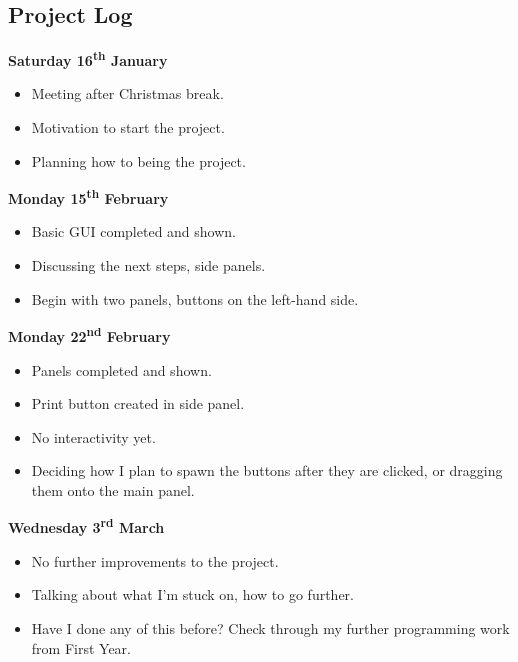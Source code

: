 \documentclass[a4paper, 12pt]{article}
\begin{document}
        \subsection{Project Log}
            \textbf{Saturday 16\textsuperscript{th} January}
                \begin{itemize}
                    \item Meeting after Christmas break.
                    \item Motivation to start the project.
                    \item Planning how to being the project. \\
                \end{itemize}
            \textbf{Monday 15\textsuperscript{th} February}
                \begin{itemize}
                    \item Basic GUI completed and shown.
                    \item Discussing the next steps, side panels.
                    \item Begin with two panels, buttons on the left-hand side. \\
                \end{itemize}
            \textbf{Monday 22\textsuperscript{nd} February}
                \begin{itemize}
                    \item Panels completed and shown.
                    \item Print button created in side panel.
                    \item No interactivity yet.
                    \item Deciding how I plan to spawn the buttons after they are clicked,
                    or dragging them onto the main panel. \\
                \end{itemize}
            \textbf{Wednesday 3\textsuperscript{rd} March}
                \begin{itemize}
                    \item No further improvements to the project.
                    \item Talking about what I'm stuck on, how to go further.
                    \item Have I done any of this before? Check through my further programming
                    work from First Year. \\
                \end{itemize}
\end{document}
